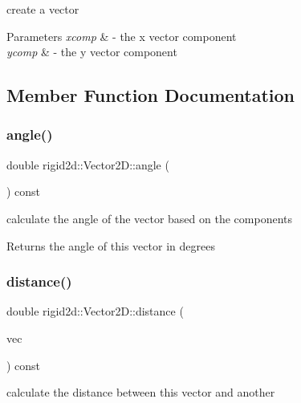 create a vector 


\begin{DoxyParams}{Parameters}
{\em xcomp} & -\/ the x vector component \\
\hline
{\em ycomp} & -\/ the y vector component \\
\hline
\end{DoxyParams}


\subsection{Member Function Documentation}
\mbox{\label{structrigid2d_1_1Vector2D_a61ec013677fd4439fa21c35656fe7256}} 
\subsubsection{\texorpdfstring{angle()}{angle()}}
{\footnotesize\ttfamily double rigid2d\+::\+Vector2\+D\+::angle (\begin{DoxyParamCaption}{ }\end{DoxyParamCaption}) const}



calculate the angle of the vector based on the components 

\begin{DoxyReturn}{Returns}
the angle of this vector in degrees 
\end{DoxyReturn}
\mbox{\label{structrigid2d_1_1Vector2D_a929393171d0ac3cc0a3f438d9a2c9cf1}} 
\subsubsection{\texorpdfstring{distance()}{distance()}}
{\footnotesize\ttfamily double rigid2d\+::\+Vector2\+D\+::distance (\begin{DoxyParamCaption}\item[{\hyperlink{structrigid2d_1_1Vector2D}{Vector2D}}]{vec }\end{DoxyParamCaption}) const}



calculate the distance between this vector and another 


